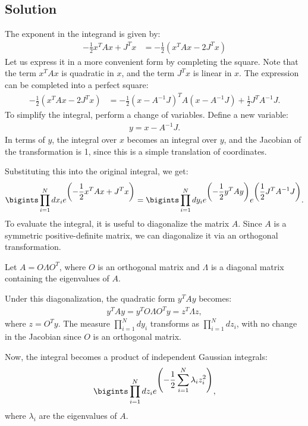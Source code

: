 \subsection*{Solution}
The exponent in the integrand is given by:
\begin{align*}
    -\frac{1}{2} x^T A x + J^T x&=-\frac{1}{2} \left( x^T A x - 2 J^T x \right)
\end{align*}
Let us express it in a more convenient form by completing the square. Note that the term $x^T A x$ is quadratic in $x$, and the term $J^T x$ is linear in $x$. The expression can be completed into a perfect square:
\begin{align}
    -\frac{1}{2} \left( x^T A x - 2 J^T x \right) &= -\frac{1}{2} \left( x - A^{-1} J \right)^T A \left( x - A^{-1} J \right) + \frac{1}{2} J^T A^{-1} J.
\end{align}
To simplify the integral, perform a change of variables. Define a new variable:
\begin{align*}
    y = x - A^{-1} J.
\end{align*}
In terms of $y$, the integral over $x$ becomes an integral over $y$, and the Jacobian of the transformation is 1, since this is a simple translation of coordinates.

Substituting this into the original integral, we get:
\begin{align}
    \bigints \prod_{i=1}^{N} dx_i e^{\displaystyle \left( -\frac{1}{2} x^T A x + J^T x \right)}
    = \bigints \prod_{i=1}^{N} dy_i e^{\displaystyle \left( -\frac{1}{2} y^T A y \right)} e^{\displaystyle \left( \frac{1}{2} J^T A^{-1} J \right)}.
\end{align}
To evaluate the integral, it is useful to diagonalize the matrix $A$. Since $A$ is a symmetric positive-definite matrix, we can diagonalize it via an orthogonal transformation. 

Let $A = O \Lambda O^T$, where $O$ is an orthogonal matrix and $\Lambda$ is a diagonal matrix containing the eigenvalues of $A$.

Under this diagonalization, the quadratic form $y^T A y$ becomes:
\begin{align}
    y^T A y = y^T O \Lambda O^T y = z^T \Lambda z,
\end{align}
where $\displaystyle z = O^T y$. The measure $\displaystyle\prod_{i=1}^{N} dy_i$ transforms as $\displaystyle\prod_{i=1}^{N} dz_i$, with no change in the Jacobian since $O$ is an orthogonal matrix.

Now, the integral becomes a product of independent Gaussian integrals:
\begin{align}
    \bigints \prod_{i=1}^{N} dz_i e^{\displaystyle \left( -\frac{1}{2} \sum_{i=1}^{N} \lambda_i z_i^2 \right)},
\end{align}
where $\lambda_i$ are the eigenvalues of $A$. 

